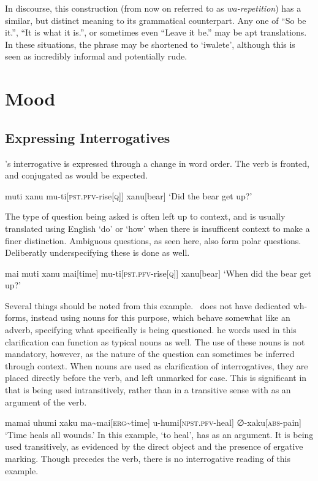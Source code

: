 In discourse, this construction (from now on referred to as \textit{wa-repetition}) has a similar, but distinct meaning to its grammatical counterpart.
Any one of ``So be it.'', ``It is what it is.'', or sometimes even ``Leave it be.'' may be apt translations.
In these situations, the phrase may be shortened to `iwalete', although this is seen as incredibly informal and potentially rude.

\section{Mood}
\subsection{Expressing Interrogatives}

\langname 's interrogative is expressed through a change in word order.
The verb is fronted, and conjugated as would be expected.

\ex
\begingl
\glpreamble muti xanu
\endpreamble
mu-ti[\textsc{pst.pfv-}rise\textsc{[q]}]
xanu[bear]
\glft `Did the bear get up?'
\endgl
\xe

The type of question being asked is often left up to context, and is usually translated using English `do' or `how' when there is insufficent context to make a finer distinction.
Ambiguous questions, as seen here, also form polar questions.
Deliberatly underspecifying these is done as well.

\ex
\begingl
\glpreamble mai muti xanu
\endpreamble
mai[time]
mu-ti[\textsc{pst.pfv-}rise\textsc{[q]}]
xanu[bear]
\glft `When did the bear get up?'
\endgl
\xe

Several things should be noted from this example.
\langname\ does not have dedicated wh-forms, instead using nouns for this purpose, which behave somewhat like an adverb, specifying what specifically is being questioned.
he words used in this clarification can function as typical nouns as well.
The use of these nouns is not mandatory, however, as the nature of the question can sometimes be inferred through context.
When nouns are used as clarification of interrogatives, they are placed directly before the verb, and left unmarked for case.
This is significant in that  is being used intransitively, rather than in a transitive sense with  as an argument of the verb.

\ex
\begingl
\glpreamble mamai uhumi xaku
\endpreamble
ma\textasciitilde mai[\textsc{erg\textasciitilde}time]
u-humi[\textsc{npst.pfv-}heal]
∅-xaku[\textsc{abs-}pain]
\glft `Time heals all wounds.'
\endgl
\xe
In this example,  `to heal', has  as an argument.
It is being used transitively, as evidenced by the direct object  and the presence of ergative marking.
Though  precedes the verb, there is no interrogative reading of this example.

